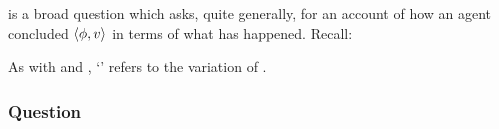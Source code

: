 \begin{note}
  \qHow{} is a broad question which asks, quite generally, for an account of how an agent concluded \(\langle \phi, v \rangle\) in terms of what has happened.
  Recall:

  \begin{quote}%
    \vspace{-1.5\baselineskip}%
    \questionHowBasic*
  \end{quote}




  As with \qWhy{} and \qWhyV{}, `\qHowV{}' refers to the variation of \qHow{}.
\end{note}



\subsubsection{Question}
\label{cha:var:sec:vars:qhowv:sec:question}


